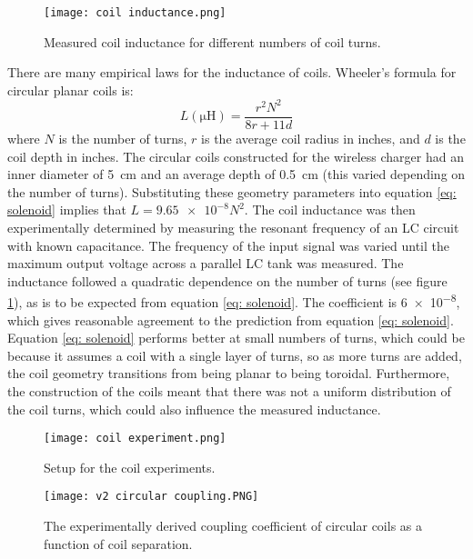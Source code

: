 \begin{figure}[htb]
	\centering
	\texttt{[image: coil inductance.png]}
	\caption{Measured coil inductance for different numbers of coil turns.}
	\label{fig: coil inductance}
\end{figure}

There are many empirical laws for the inductance of coils. Wheeler's formula \cite{Wheeler} for circular planar coils is:
\begin{equation}\label{eq: solenoid}
L (\si{\micro\henry})= \frac{r^2N^2}{8r + 11d}
\end{equation}
where $N$ is the number of turns, $r$ is the average coil radius in inches, and $d$ is the coil depth in inches. The circular coils constructed for the wireless charger had an inner diameter of \SI{5}{\centi\metre} and an average depth of \SI{0.5}{\centi\metre} (this varied depending on the number of turns). Substituting these geometry parameters into equation \ref{eq: solenoid} implies that $L=\num{9.65e-8}N^2$. The coil inductance was then experimentally determined by measuring the resonant frequency of an LC circuit with known capacitance. The frequency of the input signal was varied until the maximum output voltage across a parallel LC tank was measured. The inductance followed a quadratic dependence on the number of turns (see figure \ref{fig: coil inductance}), as is to be expected from equation \ref{eq: solenoid}. The coefficient is \num{6e-8}, which gives reasonable agreement to the prediction from equation \ref{eq: solenoid}. Equation \ref{eq: solenoid} performs better at small numbers of turns, which could be because it assumes a coil with a single layer of turns, so as more turns are added, the coil geometry transitions from being planar to being toroidal. Furthermore, the construction of the coils meant that there was not a uniform distribution of the coil turns, which could also influence the measured inductance.\\

\begin{figure}[htb]
	\centering
	\texttt{[image: coil experiment.png]}
	\caption{Setup for the coil experiments.}
	\label{fig: coil experiment setup}
\end{figure}
\begin{figure}[htb]
	\centering
	\texttt{[image: v2 circular coupling.PNG]}
	\caption{The experimentally derived coupling coefficient of circular coils as a function of coil separation.}
	\label{fig: circular coupling}
\end{figure}

